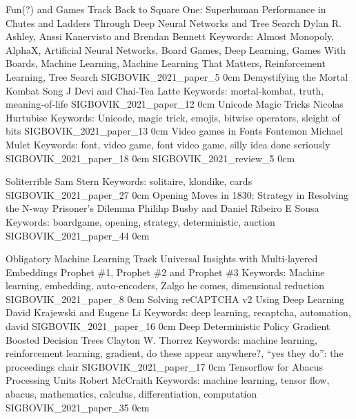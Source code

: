 \renewcommand{\thepage}{\roman{page}}
\setcounter{page}{3}

\newpage
\renewcommand{\thepage}{\arabic{page}}
\setcounter{page}{1}

\newcommand{\link}[2][]{\vspace{-1in} {\scriptsize #1 \url{#2}} \raisebox{-0.5\height}{\texttt{[image: participation]}}}
\newcommand{\badge}[1]{\texttt{[image: badges/badge\_\#1]}}
\newcommand{\badges}[1]{\vspace{-1in} \raisebox{-0.5\height}{#1}}

\addtrack
    {}{Fun(?) and Games Track}
\addpaper
    {Back to Square One: Superhuman Performance in Chutes and Ladders Through Deep Neural Networks and Tree Search}
    {Dylan R. Ashley, Anssi Kanervisto and Brendan Bennett}
    {Keywords: Almost Monopoly, AlphaX, Artificial Neural Networks, Board Games, Deep Learning, Games With Boards, Machine Learning, Machine Learning That Matters, Reinforcement Learning, Tree Search}
    {SIGBOVIK_2021_paper_5}
    {0cm}
    {\badges{\badge{unusable}}}
\addpaper
    {Demystifying the Mortal Kombat Song}
    {J Devi and Chai-Tea Latte}
    {Keywords: mortal-kombat, truth, meaning-of-life}
    {SIGBOVIK_2021_paper_12}
    {0cm}
    {}
\addpaper
    {Unicode Magic Tricks}
    {Nicolas Hurtubise}
    {Keywords: Unicode, magic trick, emojis, bitwise operators, sleight of bits}
    {SIGBOVIK_2021_paper_13}
    {0cm}
    {}
\addpaper
    {Video games in Fonts Fontemon}
    {Michael Mulet}
    {Keywords: font, video game, font video game, silly idea done seriously}
    {SIGBOVIK_2021_paper_18}
    {0cm}
    {}
\addreview
    {SIGBOVIK_2021_review_5}
    {0cm}

\addpaper
    {Soliterrible}
    {Sam Stern}
    {Keywords: solitaire, klondike, cards}
    {SIGBOVIK_2021_paper_27}
    {0cm}
    {\badges{\badge{javascript}}}
\addpaper
    {Opening Moves in 1830: Strategy in Resolving the N-way Prisoner’s Dilemma}
    {Philihp Busby and Daniel Ribeiro E Sousa}
    {Keywords: boardgame, opening, strategy, deterministic, auction}
    {SIGBOVIK_2021_paper_44}
    {0cm}
    {}

\addtrack
    {}{Obligatory Machine Learning Track}
\addpaper
    {Universal Insights with Multi-layered Embeddings}
    {Prophet \#1, Prophet \#2 and Prophet \#3}
    {Keywords: Machine learning, embedding, auto-encoders, Zalgo he comes, dimensional reduction}
    {SIGBOVIK_2021_paper_8}
    {0cm}
    {}
\addpaper
    {Solving reCAPTCHA v2 Using Deep Learning}
    {David Krajewski and Eugene Li}
    {Keywords: deep learning, recaptcha, automation, david}
    {SIGBOVIK_2021_paper_16}
    {0cm}
    {}
\addpaper
    {Deep Deterministic Policy Gradient Boosted Decision Trees}
    {Clayton W. Thorrez}
    {Keywords: machine learning, reinforcement learning, gradient, do these appear anywhere?, ``yes they do'': the proceedings chair}
    {SIGBOVIK_2021_paper_17}
    {0cm}
    {}
\addpaper
    {Tensorflow for Abacus Processing Units}
    {Robert McCraith}
    {Keywords: machine learning, tensor flow, abacus, mathematics, calculus, differentiation, computation}
    {SIGBOVIK_2021_paper_35}
    {0cm}
    {}


